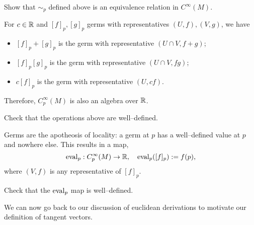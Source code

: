\begin{exercise}
  Show that $\sim_p$ defined above is an equivalence relation in $C^\infty(M)$.
\end{exercise}

For $c\in\mathbb{R}$ and $[f]_p, [g]_p$ germs with representatives $(U, f), (V, g)$, we have
\begin{itemize}
  \item $[f]_p + [g]_p$ is the germ with representative $(U\cap V, f+g)$;
  \item $[f]_p [g]_p$ is the germ with representative $(U\cap V, f g)$;
  \item $c[f]_p$ is the germ with representative $(U, cf)$.
\end{itemize}
Therefore, $C_p^\infty(M)$ is also an algebra over $\mathbb{R}$.

\begin{exercise}
  Check that the operations above are well--defined.
\end{exercise}

Germs are the apotheosis of locality: a germ at $p$ has a well--defined value at $p$ and nowhere else.
This results in a map,
\begin{equation}
  \operatorname{eval}_p: C_p^\infty(M) \to \mathbb{R}, \quad
  \operatorname{eval}_p([f]_p) := f(p),
\end{equation}
where $(V,f)$ is any representative of $[f]_p$.
\begin{exercise}
  Check that the $\operatorname{eval}_p$ map is well--defined.
\end{exercise}

We can now go back to our discussion of euclidean derivations to motivate our definition of tangent vectors.

